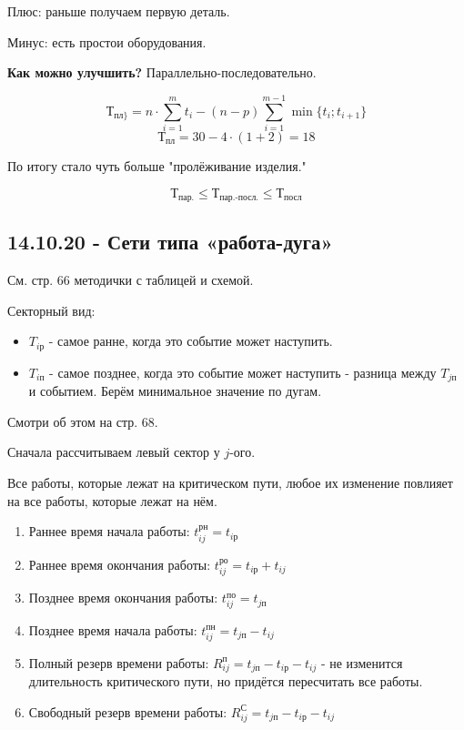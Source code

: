 Плюс: раньше получаем первую деталь.

Минус: есть простои оборудования.

\noindent\textbf{Как можно улучшить?} Параллельно-последовательно.

\[
\text{Т}_{\text{пл}\}} = n \cdot \sum_{i=1}^{m} t_i - (n - p) \sum_{i=1}^{m-1} \min \{t_i; t_{i+1}\}
\]
\[
\text{Т}_{\text{пл}} = 30 - 4 \cdot (1 + 2) = 18
\]

По итогу стало чуть больше "пролёживание изделия."\,

\[
\text{Т}_{\text{пар.}} \le \text{Т}_{\text{пар.-посл.}} \le \text{Т}_{\text{посл}}
\]

\subsection{14.10.20 - Сети типа «работа-дуга»}

См. стр. 66 методички с таблицей и схемой.

Секторный вид:

\begin{itemize}
	\item $T_{i\text{р}}$ - самое ранне, когда это событие может наступить.
	\item $T_{i\text{п}}$ - самое позднее, когда это событие может наступить - разница между $T_{j\text{п}}$ и событием. Берём минимальное значение по дугам.
\end{itemize}

\begin{remark}
	Смотри об этом на стр. 68.
\end{remark}

Сначала рассчитываем левый сектор у $j$-ого.

Все работы, которые лежат на критическом пути, любое их изменение повлияет на все работы, которые лежат на нём.

\begin{enumerate}
	\item Раннее время начала работы: $t_{ij}^{\text{рн}} = t_{i\text{р}}$
	\item Раннее время окончания работы: $t_{ij}^{\text{ро}} = t_{i\text{р}} + t_{ij}$
	\item Позднее время окончания работы: $t_{ij}^{\text{по}} = t_{j\text{п}}$
	\item Позднее время начала работы: $t_{ij}^{\text{пн}} = t_{j\text{п}} - t_{ij}$
	\item Полный резерв времени работы: $R_{ij}^{\text{п}} = t_{j\text{п}} - t_{i\text{р}} - t_{ij}$ - не изменится длительность критического пути, но придётся пересчитать все работы.
	\item Свободный резерв времени работы: $R_{ij}^{\text{С}} = t_{j\text{п}} - t_{i\text{р}} - t_{ij}$
\end{enumerate}

\newpage

\tableofcontents

